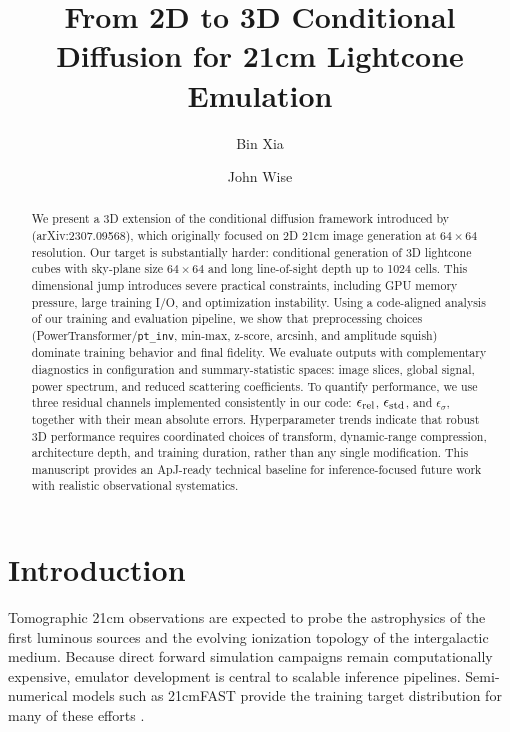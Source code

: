 \documentclass{aastex631}
\begin{document}
\title{From 2D to 3D Conditional Diffusion for 21cm Lightcone Emulation}

\author[0000-0002-7077-9836]{Bin Xia}

\author[0000-0003-1173-8847]{John Wise}

\begin{abstract}
We present a 3D extension of the conditional diffusion framework introduced by \citet{zhao2023can} (arXiv:2307.09568), which originally focused on 2D 21cm image generation at $64\times 64$ resolution. Our target is substantially harder: conditional generation of 3D lightcone cubes with sky-plane size $64\times 64$ and long line-of-sight depth up to 1024 cells. This dimensional jump introduces severe practical constraints, including GPU memory pressure, large training I/O, and optimization instability. Using a code-aligned analysis of our training and evaluation pipeline, we show that preprocessing choices (PowerTransformer/\texttt{pt\_inv}, min-max, z-score, arcsinh, and amplitude squish) dominate training behavior and final fidelity. We evaluate outputs with complementary diagnostics in configuration and summary-statistic spaces: image slices, global signal, power spectrum, and reduced scattering coefficients. To quantify performance, we use three residual channels implemented consistently in our code: $\epsilon_{\rm rel}$, $\epsilon_{\rm std}$, and $\epsilon_{\sigma}$, together with their mean absolute errors. Hyperparameter trends indicate that robust 3D performance requires coordinated choices of transform, dynamic-range compression, architecture depth, and training duration, rather than any single modification. This manuscript provides an ApJ-ready technical baseline for inference-focused future work with realistic observational systematics.
\end{abstract}


\section{Introduction}
Tomographic 21cm observations are expected to probe the astrophysics of the first luminous sources and the evolving ionization topology of the intergalactic medium. Because direct forward simulation campaigns remain computationally expensive, emulator development is central to scalable inference pipelines. Semi-numerical models such as 21cmFAST provide the training target distribution for many of these efforts \citep{2011MNRAS.411..955M,2018MNRAS.477.3217G}.
\end{document}
